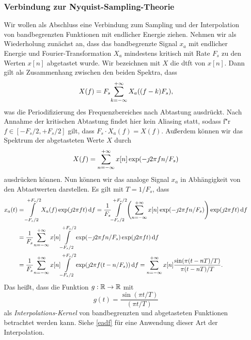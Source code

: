 \subsubsection{Verbindung zur Nyquist-Sampling-Theorie}
%
%
Wir wollen als Abschluss eine Verbindung zum Sampling und der Interpolation~\cite[Kapitel~6.1]{proakis2013} von bandbegrenzten Funktionen mit endlicher Energie ziehen. Nehmen wir als Wiederholung zun\"achst an, dass das bandbegrenzte Signal $x_a$ mit endlicher Energie und Fourier-Transformation $X_a$ mindestens kritisch mit Rate $F_s$ zu den Werten $x[n]$ abgetastet wurde. Wir bezeichnen mit $X$ die \gls{dtft} von $x[n]$. Dann gilt als Zusammenhang zwischen den beiden Spektra, dass
\begin{equation}
    X(f) = F_s {\sum\limits_{k=-\infty}^{+\infty}{
        X_a((f - k) F_s)
    }} ,
\end{equation}
was die Periodifizierung des Frequenzbereiches nach Abtastung ausdr\"uckt. Nach Annahme der kritischen Abtastung findet hier kein Aliasing statt, sodass f\u"r $f \in [-F_s/2,+F_s/2]$ gilt, dass $F_s \cdot X_a(f) = X(f)$. Au{\ss}erdem k\"onnen wir das Spektrum der abgetasteten Werte $X$ durch
\begin{equation}
    X(f) = {\sum\limits_{n=-\infty}^{+\infty}{x[n] \exp(- \jmath 2 \pi f n / F_s)}}
\end{equation}
ausdr\"ucken k\"onnen. Nun k\"onnen wir das analoge Signal $x_a$ in Abh\"angigkeit von den Abtastwerten darstellen. Es gilt mit $T = 1/F_s$, dass
\begin{align*}
    x_a(t) &= {\int\limits_{-F_s/2}^{+F_s/2}{
        X_a(f) \exp(\jmath 2 \pi f t)
    }\,\mathrm{d}{f}} = \frac{1}{F_s} {\int\limits_{-F_s/2}^{+F_s/2}{
        \left(
            {\sum\limits_{n=-\infty}^{+\infty}{x[n] \exp(- \jmath 2 \pi f n / F_s)}}
        \right) \exp(\jmath 2 \pi f t)
    }\,\mathrm{d}{f}} \\
    &= \frac{1}{F_s} 
        {\sum\limits_{n=-\infty}^{+\infty}{
            x[n] {\int\limits_{-F_s/2}^{+F_s/2}{\exp(- \jmath 2 \pi f n / F_s) \exp(\jmath 2 \pi f t)}\,\mathrm{d}{f}}
        }} \\
    &= \frac{1}{F_s} 
    {\sum\limits_{n=-\infty}^{+\infty}{
        x[n] {\int\limits_{-F_s/2}^{+F_s/2}{\exp(\jmath 2 \pi f (t - n/F_s))}\,\mathrm{d}{f}}
    }} 
    = {\sum\limits_{n=-\infty}^{+\infty}{
        x[n] \frac{\sin(\pi(t-nT)/T)}{\pi(t-nT)/T}
    }}.
\end{align*}
Das hei{\ss}t, dass die Funktion $g: \mathbb{R} \rightarrow \mathbb{R}$ mit
\begin{equation}\label{bsplines_sinckernel}
    g(t) = \frac{\sin(\pi t / T)}{(\pi t/T)}
\end{equation}
als \emph{Interpolations-Kernel} von bandbegrenzten und abgetasteten Funktionen betrachtet werden kann. Siehe \cref{eadf} f\"ur eine Anwendung dieser Art der Interpolation.

